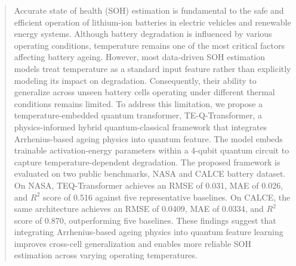 \documentclass[a4paper,fleqn]{cas-sc}
\begin{document}
\begin{abstract}
Accurate state of health (SOH) estimation is fundamental to the safe and efficient operation of lithium-ion batteries in electric vehicles and renewable energy systems. Although battery degradation is influenced by various operating conditions, temperature remains one of the most critical factors affecting battery ageing. However, most data-driven SOH estimation models treat temperature as a standard input feature rather than explicitly modeling its impact on degradation. Consequently, their ability to generalize across unseen battery cells operating under different thermal conditions remains limited. To address this limitation, we propose a temperature-embedded quantum transformer, TE-Q-Transformer, a physics-informed hybrid quantum-classical framework that integrates Arrhenius-based ageing physics into quantum feature. The model embeds trainable activation-energy parameters within a 4-qubit quantum circuit to capture temperature-dependent degradation. The proposed framework is evaluated on two public benchmarks, NASA and CALCE battery dataset. On NASA, TEQ-Transformer achieves an RMSE of 0.031, MAE of 0.026, and $R^2$ score of 0.516 against five representative baselines. On CALCE, the same architecture achieves an RMSE of 0.0409, MAE of 0.0334, and $R^2$ score of 0.870, outperforming five baselines. These findings suggest that integrating Arrhenius-based ageing physics into quantum feature learning improves cross-cell generalization and enables more reliable SOH estimation across varying operating temperatures.
\end{abstract}
\end{document}
